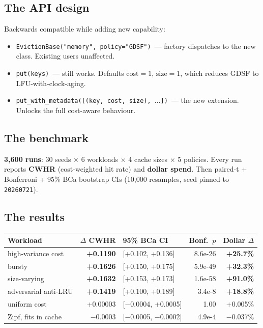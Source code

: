 \documentclass[11pt,a4paper]{article}
\begin{document}
\subsection{The API design}
Backwards compatible while adding new capability:
\begin{itemize}[leftmargin=1.5em,itemsep=0.1em]
  \item \texttt{EvictionBase("memory", policy="GDSF")}~--- factory
        dispatches to the new class. Existing users unaffected.
  \item \texttt{put(keys)}~--- still works. Defaults $\mathrm{cost}=1$,
        $\mathrm{size}=1$, which reduces GDSF to LFU-with-clock-aging.
  \item \texttt{put\_with\_metadata([(key, cost, size), $\dots$])}~---
        the new extension. Unlocks the full cost-aware behaviour.
\end{itemize}

\subsection{The benchmark}
\textbf{3{,}600 runs}: 30 seeds $\times$ 6 workloads $\times$ 4 cache
sizes $\times$ 5 policies. Every run reports \textbf{CWHR}
(cost-weighted hit rate) and \textbf{dollar spend}. Then paired-t +
Bonferroni + 95\% BCa bootstrap CIs (10{,}000 resamples, seed pinned to
\texttt{20260721}).

\subsection{The results}

\begin{center}
\small
\begin{tabular}{l r l r r}
\toprule
\textbf{Workload} & \textbf{$\Delta$ CWHR} & \textbf{95\% BCa CI} & \textbf{Bonf.\ $p$} & \textbf{Dollar $\Delta$} \\
\midrule
high-variance cost   & \textbf{+0.1190}   & [+0.102, +0.136]  & 8.6e-26 & \textbf{+25.7\%} \\
bursty               & \textbf{+0.1626}   & [+0.150, +0.175]  & 5.9e-49 & \textbf{+32.3\%} \\
size-varying         & \textbf{+0.1632}   & [+0.153, +0.173]  & 1.6e-58 & \textbf{+91.0\%} \\
adversarial anti-LRU & \textbf{+0.1419}   & [+0.100, +0.189]  & 3.4e-8  & \textbf{+18.8\%} \\
uniform cost         & +0.00003           & [$-$0.0004, +0.0005] & 1.00 & +0.005\% \\
Zipf, fits in cache  & $-$0.0003          & [$-$0.0005, $-$0.0002] & 4.9e-4 & $-$0.037\% \\
\bottomrule
\end{tabular}
\end{center}
\end{document}

